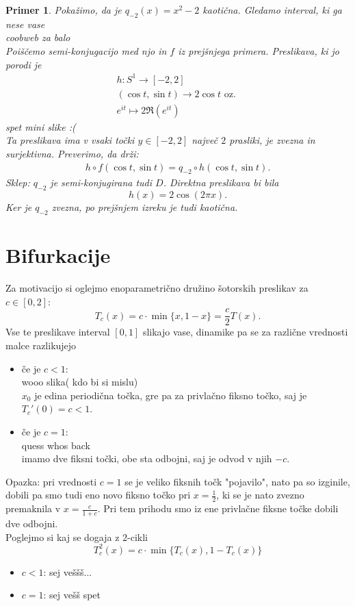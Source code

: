 \documentclass{article}
\newtheorem{primer}{Primer}
\begin{document}
\begin{primer}
Pokažimo, da je $q_{-2}(x) = x^2 - 2$ kaotična. Gledamo interval, ki ga nese vase\\ 
coobweb za balo\\ 
Poiščemo semi-konjugacijo med njo in $f$ iz prejšnjega primera. Preslikava, ki jo porodi je 
\begin{align*}
h: S^1 \rightarrow [-2, 2] \\ 
(\cos{t}, \sin{t}) \rightarrow 2\cos{t} \text{ oz. }\\ 
e^{it} \mapsto 2\Re(e^{it}) 
\end{align*}
spet mini slike :(\\ 
Ta preslikava ima v vsaki točki $y\in [-2, 2]$ največ $2$ prasliki, je zvezna in surjektivna. Preverimo, da drži:
\begin{align*}
h\circ f(\cos{t}, \sin{t}) = q_{-2} \circ h(\cos{t}, \sin{t}).
\end{align*}
Sklep: $q_{-2}$ je semi-konjugirana tudi $D$. Direktna preslikava bi bila 
$$
h(x) = 2\cos(2\pi x).
$$
Ker je $q_{-2}$ zvezna, po prejšnjem izreku je tudi kaotična.
\end{primer}

\section{Bifurkacije}

Za motivacijo si oglejmo enoparametrično družino šotorskih preslikav za $c\in [0, 2]$:
$$
T_c(x) = c\cdot \min\{x, 1-x\} = \frac{c}{2} T(x).
$$
Vse te preslikave interval $[0, 1]$ slikajo vase, dinamike pa se za različne vrednosti malce razlikujejo
\begin{itemize}
\item če je $c < 1$: \\
wooo slika( kdo bi si mislu)\\ 
$x_0$ je edina periodična točka, gre pa za privlačno fiksno točko, saj je $T_c'(0) = c < 1$.
\item če je $c = 1$: \\ 
quess whos back \\ 
imamo dve fiksni točki, obe sta odbojni, saj je odvod v njih $-c$.
\end{itemize}
Opazka: pri vrednosti $c=1$ se je veliko fiksnih točk
"pojavilo", nato pa so izginile, dobili pa smo tudi eno novo fiksno točko pri $x = \frac{1}{2}$, ki se je nato zvezno premaknila v $x = \frac{c}{1 + c}$. Pri tem prihodu smo iz ene privlačne fiksne točke dobili dve odbojni.\\ 
Poglejmo si kaj se dogaja z $2$-cikli 
$$
T_c^2(x) = c\cdot \min\{ T_c(x), 1 - T_c(x)\}
$$
\begin{itemize}
\item $c < 1$: sej veššš... 
\item $c = 1$: sej vešš spet
\end{itemize}
\end{document}
